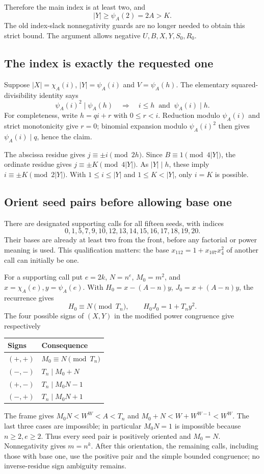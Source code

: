 \documentclass[11pt]{article}
\theoremstyle{definition}\newtheorem{definition}[theorem]{Definition}
\theoremstyle{remark}\newtheorem{remark}[theorem]{Remark}
\begin{document}
Therefore the main index is at least two, and
\begin{equation}\label{eq:automaticbound}
 |Y|\ge\psi_A(2)=2A>K.
\end{equation}
The old index-slack nonnegativity guards are no longer needed to obtain
this strict bound. The argument allows negative $U,B,X,Y,S_0,R_0$.

\subsection{The index is exactly the requested one}
Suppose $|X|=\chi_A(i)$, $|Y|=\psi_A(i)$ and
$V=\psi_A(h)$. The elementary squared-divisibility identity says
\[
 \psi_A(i)^2\mid\psi_A(h)\quad\Longrightarrow\quad
 i\le h\ \text{ and }\ \psi_A(i)\mid h.
\]
For completeness, write $h=qi+r$ with $0\le r<i$. Reduction modulo
$\psi_A(i)$ and strict monotonicity give $r=0$; binomial expansion
modulo $\psi_A(i)^2$ then gives $\psi_A(i)\mid q$, hence the claim.

The abscissa residue gives $j\equiv\pm i\pmod{2h}$. Since
$B\equiv1\pmod{4|Y|}$, the ordinate residue gives
$j\equiv\pm K\pmod{4|Y|}$. As $|Y|\mid h$, these imply
$i\equiv\pm K\pmod{2|Y|}$. With
$1\le i\le|Y|$ and $1\le K<|Y|$, only $i=K$ is possible.

\subsection{Orient seed pairs before allowing base one}
There are designated supporting calls for all fifteen seeds, with
indices
\[
 0,1,5,7,9,10,12,13,14,15,16,17,18,19,20.
\]
Their bases are already at least two from the front, before any factorial
or power meaning is used. This qualification matters: the base
$x_{112}=1+x_{107}x_4^2$ of another call can initially be one.

For a supporting call put $e=2k$, $N=n^e$, $M_0=m^2$, and
$x=\chi_A(e),y=\psi_A(e)$. With
$H_0=x-(A-n)y$, $J_0=x+(A-n)y$, the recurrence gives
\[
 H_0\equiv N\pmod{T_n},\qquad
 H_0J_0=1+T_ny^2.
\]
The four possible signs of $(X,Y)$ in the modified power congruence
give respectively
\begin{center}
\begin{tabular}{ll}\toprule
Signs & Consequence\\\midrule
$(+,+)$ &$M_0\equiv N\pmod{T_n}$\\
$(-,-)$ &$T_n\mid M_0+N$\\
$(+,-)$ &$T_n\mid M_0N-1$\\
$(-,+)$ &$T_n\mid M_0N+1$\\\bottomrule
\end{tabular}\end{center}
The frame gives $M_0N<W^W<A<T_n$ and
$M_0+N<W+W^{W-1}<W^W$. The last three cases are impossible; in
particular $M_0N=1$ is impossible because $n\ge2,e\ge2$. Thus every
seed pair is positively oriented and $M_0=N$. Nonnegativity gives
$m=n^k$. After this orientation, the remaining calls, including those
with base one, use the positive pair and the simple bounded congruence;
no inverse-residue sign ambiguity remains.
\end{document}
